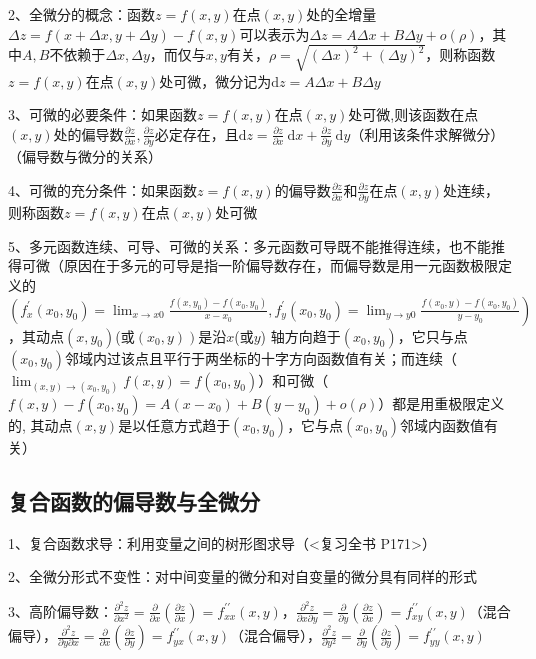 2、全微分的概念：函数$z=f(x, y)$在点$(x, y)$处的全增量$\Delta z=f(x+\Delta x, y+\Delta y)-f(x, y)$可以表示为$\Delta z=A \Delta x+B \Delta y+o(\rho)$，其中$A,B$不依赖于$\Delta x, \Delta y$，而仅与$x, y$有关，$\rho=\sqrt{(\Delta x)^{2}+(\Delta y)^{2}}$，则称函数$z=f(x, y)$在点$(x, y)$处可微，微分记为$\mathrm{d} z=A \Delta x+B \Delta y$

3、可微的必要条件：如果函数$z=f(x, y)$在点$(x, y)$处可微,则该函数在点$(x, y)$处的偏导数$\frac{\partial z}{\partial x}, \frac{\partial z}{\partial y}$必定存在，且$\mathrm{d} z=\frac{\partial z}{\partial x} \mathrm{~d} x+\frac{\partial z}{\partial y} \mathrm{~d} y$（利用该条件求解微分）（偏导数与微分的关系）

4、可微的充分条件：如果函数$z=f(x, y)$的偏导数$\frac{\partial z}{\partial x}$和$\frac{\partial z}{\partial y}$在点$(x, y)$处连续，则称函数$z=f(x, y)$在点$(x, y)$处可微

5、多元函数连续、可导、可微的关系：多元函数可导既不能推得连续，也不能推得可微（原因在于多元的可导是指一阶偏导数存在，而偏导数是用一元函数极限定义的$\left(f_{x}^{\prime}\left(x_{0}\right.\right., \left.\left.y_{0}\right)=\lim_{x \rightarrow x{0}} \frac{f\left(x, y_{0}\right)-f\left(x_{0}, y_{0}\right)}{x-x_{0}}, f_{y}^{\prime}\left(x_{0}, y_{0}\right)=\lim_{y \rightarrow y{0}} \frac{f\left(x_{0}, y\right)-f\left(x_{0}, y_{0}\right)}{y-y_{0}}\right)$，其动点$\left(x, y_{0}\right)$(或$\left.\left(x_{0}, y\right)\right)$是沿$x$(或$y$) 轴方向趋于$\left(x_{0}, y_{0}\right)$，它只与点$\left(x_{0}, y_{0}\right)$邻域内过该点且平行于两坐标的十字方向函数值有关；而连续（$\lim_{(x, y) \rightarrow\left(x_{0}, y_{0}\right)} f(x, y)=f\left(x_{0}, y_{0}\right)$）和可微（$f(x, y)-f(x_{0},y_{0})=A\left(x-x_{0}\right)+B\left(y-y_{0}\right)+o(\rho)$）都是用重极限定义的, 其动点$(x, y)$是以任意方式趋于$\left(x_{0}, y_{0}\right)$，它与点$\left(x_{0}, y_{0}\right)$邻域内函数值有关）



\subsection{复合函数的偏导数与全微分}

1、复合函数求导：利用变量之间的树形图求导（<复习全书 P171>）

2、全微分形式不变性：对中间变量的微分和对自变量的微分具有同样的形式

3、高阶偏导数：$\frac{\partial^{2} z}{\partial x^{2}}=\frac{\partial}{\partial x}\left(\frac{\partial z}{\partial x}\right)=f_{x x}^{\prime \prime}(x, y)$，$\frac{\partial^{2} z}{\partial x \partial y}=\frac{\partial}{\partial y}\left(\frac{\partial z}{\partial x}\right)=f_{x y}^{\prime \prime}(x, y)$（混合偏导），$\frac{\partial^{2} z}{\partial y \partial x}=\frac{\partial}{\partial x}\left(\frac{\partial z}{\partial y}\right)=f_{y x}^{\prime \prime}(x, y)$（混合偏导），$\frac{\partial^{2} z}{\partial y^{2}}=\frac{\partial}{\partial y}\left(\frac{\partial z}{\partial y}\right)=f_{y y}^{\prime \prime}(x, y)$

